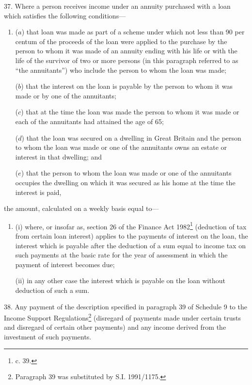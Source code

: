 \documentclass[12pt,a4paper]{article}
\begin{document}
37.  Where a person receives income under an annuity purchased with a loan which satisfies the following conditions—
\begin{enumerate}\item[]
($a$) that loan was made as part of a scheme under which not less than 90 per centum of the proceeds of the loan were applied to the purchase by the person to whom it was made of an annuity ending with his life or with the life of the survivor of two or more persons (in this paragraph referred to as “the annuitants”) who include the person to whom the loan was made;

($b$) that the interest on the loan is payable by the person to whom it was made or by one of the annuitants;

($c$) that at the time the loan was made the person to whom it was made or each of the annuitants had attained the age of 65;

($d$) that the loan was secured on a dwelling in Great Britain and the person to whom the loan was made or one of the annuitants owns an estate or interest in that dwelling; and

($e$) that the person to whom the loan was made or one of the annuitants occupies the dwelling on which it was secured as his home at the time the interest is paid,
\end{enumerate}
the amount, calculated on a weekly basis equal to—
\begin{enumerate}\item[]
(i) where, or insofar as, section 26 of the Finance Act 1982\footnote{ c. 39.} (deduction of tax from certain loan interest) applies to the payments of interest on the loan, the interest which is payable after the deduction of a sum equal to income tax on such payments at the basic rate for the year of assessment in which the payment of interest becomes due;

(ii) in any other case the interest which is payable on the loan without deduction of such a sum.
\end{enumerate}

\medskip

38.  Any payment of the description specified in paragraph 39 of Schedule 9 to the Income Support Regulations\footnote{\frenchspacing Paragraph 39 was substituted by S.I. 1991/1175.} (disregard of payments made under certain trusts and disregard of certain other payments) and any income derived from the investment of such payments.

\medskip
\end{document}
